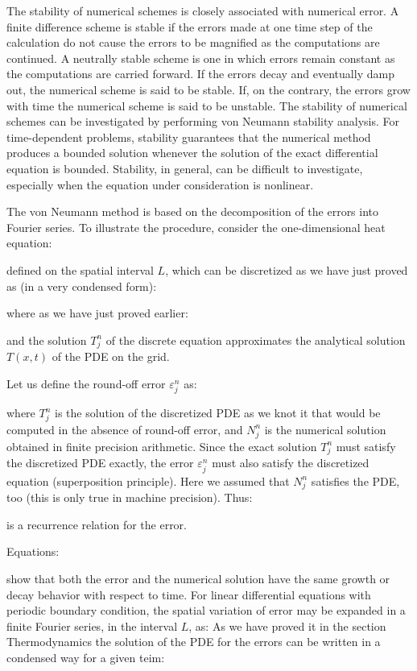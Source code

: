 	The stability of numerical schemes is closely associated with numerical error. A finite difference scheme is stable if the errors made at one time step of the calculation do not cause the errors to be magnified as the computations are continued. A neutrally stable scheme is one in which errors remain constant as the computations are carried forward. If the errors decay and eventually damp out, the numerical scheme is said to be stable. If, on the contrary, the errors grow with time the numerical scheme is said to be unstable. The stability of numerical schemes can be investigated by performing von Neumann stability analysis. For time-dependent problems, stability guarantees that the numerical method produces a bounded solution whenever the solution of the exact differential equation is bounded. Stability, in general, can be difficult to investigate, especially when the equation under consideration is nonlinear.
	 
	The von Neumann method is based on the decomposition of the errors into Fourier series. To illustrate the procedure, consider the one-dimensional heat equation:
	
	defined on the spatial interval $L$, which can be discretized as we have just proved as (in a very condensed form):
	
	where as we have just proved earlier:
	
	and the solution $T_j^n$ of the discrete equation approximates the analytical solution $T(x,t)$ of the PDE on the grid.
	
	Let us define the round-off error $\varepsilon_j^n$ as:
	
	where $T_j^n$ is the solution of the discretized PDE as we knot it that would be computed in the absence of round-off error, and $N_j^n$ is the numerical solution obtained in finite precision arithmetic. Since the exact solution $T_j^n$ must satisfy the discretized PDE exactly, the error $\varepsilon_j^n$ must also satisfy the discretized equation (superposition principle). Here we assumed that $N_j^n$ satisfies the PDE, too (this is only true in machine precision). Thus:
	
	is a recurrence relation for the error. 

	Equations:
	
	show that both the error and the numerical solution have the same growth or decay behavior with respect to time. For linear differential equations with periodic boundary condition, the spatial variation of error may be expanded in a finite Fourier series, in the interval $L$, as:
	As we have proved it in the section Thermodynamics the solution of the PDE for the errors can be written in a condensed way for a given teim:
	
